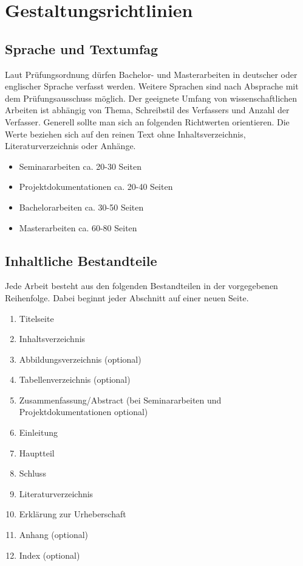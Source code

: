 \chapter{Gestaltungsrichtlinien}\label{sec:gestaltungsrichtlinien}

\section{Sprache und Textumfag}\label{subsec:sprache_textumfang}

Laut Prüfungsordnung dürfen Bachelor- und Masterarbeiten in deutscher oder englischer Sprache verfasst werden. Weitere Sprachen sind nach Absprache mit dem Prüfungsausschuss möglich. Der geeignete Umfang von wissenschaftlichen Arbeiten ist abhängig von Thema, Schreibstil des Verfassers und Anzahl der Verfasser. Generell sollte man sich an folgenden Richtwerten orientieren. Die Werte beziehen sich auf den reinen Text ohne Inhaltsverzeichnis, Literaturverzeichnis oder Anhänge.

\begin{itemize}
    \item{Seminararbeiten ca. 20-30 Seiten}
    \item{Projektdokumentationen ca. 20-40 Seiten}
    \item{Bachelorarbeiten ca. 30-50 Seiten}
    \item{Masterarbeiten ca. 60-80 Seiten}
\end{itemize}

\section{Inhaltliche Bestandteile}\label{subsec:inhaltliche_bestandteile}

Jede Arbeit besteht aus den folgenden Bestandteilen in der vorgegebenen Reihenfolge. Dabei beginnt jeder Abschnitt auf einer neuen Seite. 
\begin{enumerate}
    \item{Titelseite}
    \item{Inhaltsverzeichnis}
    \item{Abbildungsverzeichnis (optional)}
    \item{Tabellenverzeichnis (optional)}
    \item{Zusammenfassung/Abstract (bei Seminararbeiten und Projektdokumentationen optional)}
    \item{Einleitung}
    \item{Hauptteil}
    \item{Schluss}
    \item{Literaturverzeichnis}
    \item{Erklärung zur Urheberschaft}
    \item{Anhang (optional)}
    \item{Index (optional)}
\end{enumerate}

